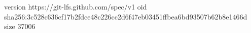 version https://git-lfs.github.com/spec/v1
oid sha256:3c528c636cf17b2fdce48c226cc2d6f47eb03451ffbea6bd93507b62b8e1466d
size 37006
